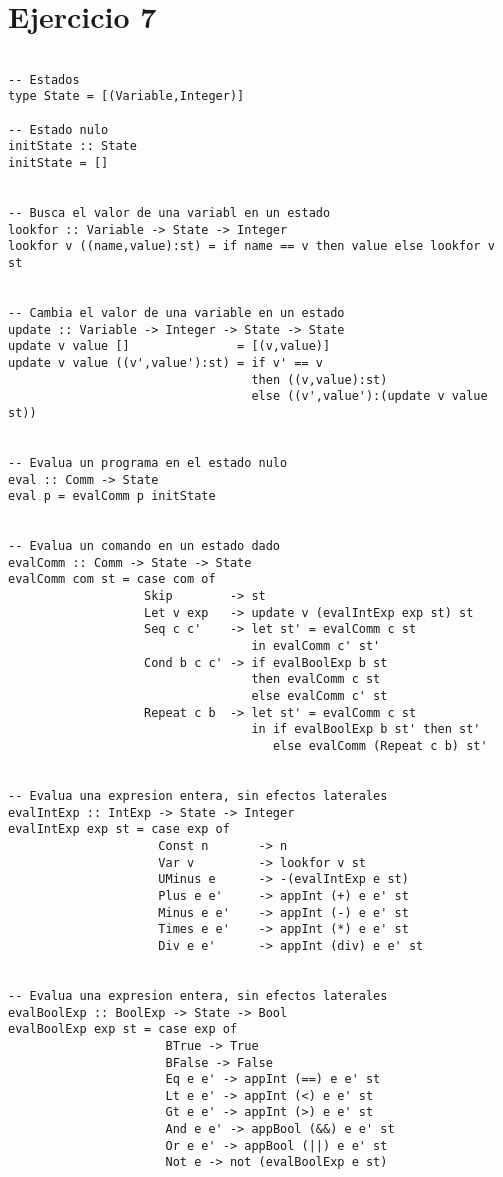 \documentclass[12pt,a4paper]{article}
\begin{document}
\newpage

\section*{Ejercicio 7}
\begin{verbatim}

-- Estados
type State = [(Variable,Integer)]

-- Estado nulo
initState :: State
initState = []


-- Busca el valor de una variabl en un estado
lookfor :: Variable -> State -> Integer
lookfor v ((name,value):st) = if name == v then value else lookfor v st


-- Cambia el valor de una variable en un estado
update :: Variable -> Integer -> State -> State
update v value []               = [(v,value)]
update v value ((v',value'):st) = if v' == v 
                                  then ((v,value):st)
                                  else ((v',value'):(update v value st))


-- Evalua un programa en el estado nulo
eval :: Comm -> State
eval p = evalComm p initState


-- Evalua un comando en un estado dado
evalComm :: Comm -> State -> State
evalComm com st = case com of
                   Skip        -> st
                   Let v exp   -> update v (evalIntExp exp st) st
                   Seq c c'    -> let st' = evalComm c st
                                  in evalComm c' st'
                   Cond b c c' -> if evalBoolExp b st
                                  then evalComm c st
                                  else evalComm c' st
                   Repeat c b  -> let st' = evalComm c st
                                  in if evalBoolExp b st' then st'
                                     else evalComm (Repeat c b) st'


-- Evalua una expresion entera, sin efectos laterales
evalIntExp :: IntExp -> State -> Integer
evalIntExp exp st = case exp of
                     Const n       -> n
                     Var v         -> lookfor v st
                     UMinus e      -> -(evalIntExp e st)
                     Plus e e'     -> appInt (+) e e' st
                     Minus e e'    -> appInt (-) e e' st
                     Times e e'    -> appInt (*) e e' st
                     Div e e'      -> appInt (div) e e' st


-- Evalua una expresion entera, sin efectos laterales
evalBoolExp :: BoolExp -> State -> Bool
evalBoolExp exp st = case exp of
                      BTrue -> True
                      BFalse -> False
                      Eq e e' -> appInt (==) e e' st
                      Lt e e' -> appInt (<) e e' st
                      Gt e e' -> appInt (>) e e' st
                      And e e' -> appBool (&&) e e' st
                      Or e e' -> appBool (||) e e' st
                      Not e -> not (evalBoolExp e st)



\end{verbatim}
\end{document}
